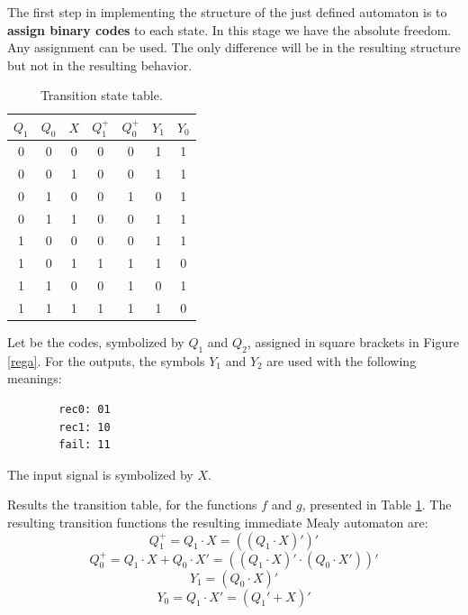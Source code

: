 \begin{exemplu}
The first step in implementing the structure of the just defined
automaton is to {\bf assign binary codes} to each state.
In this stage we have the absolute freedom. Any assignment can be
used. The only difference will be in the resulting structure but
not in the resulting behavior.

\begin{table}[H]
  \begin{center}
    \caption{Transition state table.}
    \label{table1}
    \begin{tabular}{|c|c|c||c|c|c|c|}
      \hline
     $Q_1$ & $Q_0$& $X$& $Q^+_1$& $Q^+_0$ & $Y_1$ & $Y_0$\\
     \hline \hline
   0&       0&     0&        0&       0 & 1  & 1 \\ \hline
   0&       0&     1&        0&       0 & 1  & 1 \\ \hline
   0&       1&     0&        0&       1 & 0  & 1 \\ \hline
   0&       1&     1&        0&       0 & 1  & 1 \\ \hline
   1&       0&     0&        0&       0 & 1  & 1 \\ \hline
   1&       0&     1&        1&       1 & 1  & 0 \\ \hline
   1&       1&     0&        0&       1 & 0  & 1 \\ \hline
   1&       1&     1&        1&       1 & 1  & 0 \\ \hline
    \end{tabular}
  \end{center}
\end{table}


Let be the codes, symbolized by $Q_1$ and $Q_2$, assigned in square brackets
in Figure \ref{rega}. For the outputs, the symbols $Y_1$ and $Y_2$ are used with the following meanings:
\begin{verbatim}
        rec0: 01
        rec1: 10
        fail: 11
\end{verbatim}
The input signal is symbolized by $X$.

Results the transition table, for the functions $f$ and $g$, presented in
Table \ref{table1}. The resulting transition functions the resulting immediate Mealy automaton are:
$$Q_{1}^{+} = Q_{1} \cdot X = ((Q_{1} \cdot X)')'$$
$$Q_{0}^{+} = Q_{1} \cdot X + Q_{0} \cdot X' = ((Q_{1} \cdot X)' \cdot (Q_{0} \cdot X'))'$$
$$Y_1 = (Q_0 \cdot X)'$$
$$Y_0 = Q_1 \cdot X' = (Q_1' + X)'$$


\end{exemplu}
